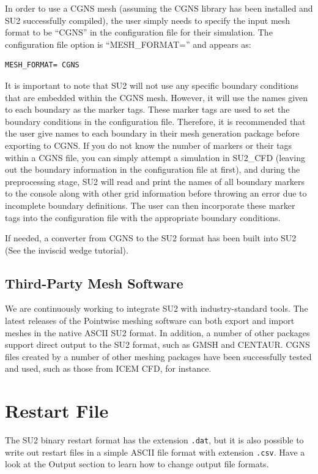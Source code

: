 \documentclass{article}
\begin{document}
In order to use a CGNS mesh (assuming the CGNS library has been installed and SU2 successfully compiled), the user simply needs to specify the input mesh format to be “CGNS” in the configuration file for their simulation. The configuration file option is “MESH\_FORMAT=” and appears as:

\begin{lstlisting}
MESH_FORMAT= CGNS
\end{lstlisting}


It is important to note that SU2 will not use any specific boundary conditions that are embedded within the CGNS mesh. However, it will use the names given to each boundary as the marker tags. These marker tags are used to set the boundary conditions in the configuration file. Therefore, it is recommended that the user give names to each boundary in their mesh generation package before exporting to CGNS. If you do not know the number of markers or their tags within a CGNS file, you can simply attempt a simulation in SU2\_CFD (leaving out the boundary information in the configuration file at first), and during the preprocessing stage, SU2 will read and print the names of all boundary markers to the console along with other grid information before throwing an error due to incomplete boundary definitions. The user can then incorporate these marker tags into the configuration file with the appropriate boundary conditions.

If needed, a converter from CGNS to the SU2 format has been built into SU2 (See the inviscid wedge tutorial).

\subsection{Third-Party Mesh Software}


We are continuously working to integrate SU2 with industry-standard tools. The latest releases of the Pointwise meshing software can both export and import meshes in the native ASCII SU2 format. In addition, a number of other packages support direct output to the SU2 format, such as GMSH and CENTAUR. CGNS files created by a number of other meshing packages have been successfully tested and used, such as those from ICEM CFD, for instance.

\newpage

\section{Restart File}
The SU2 binary restart format has the extension \verb|.dat|, but it is also possible to write out restart files in a simple ASCII file format with extension \verb|.csv|. Have a look at the Output section to learn how to change output file formats.
\end{document}
